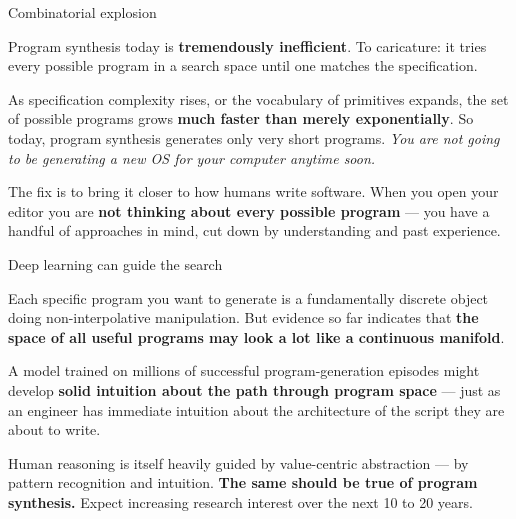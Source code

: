 \documentclass[aspectratio=169,11pt,t]{beamer}
\begin{document}
\begin{frame}[shrink=25]{Combinatorial explosion}
{\fontsize{9.4}{12.6}\selectfont\color{fg2}Program synthesis today is \textbf{tremendously inefficient}. To caricature: it tries every possible program in a search space until one matches the specification.\par}\vskip 4pt
{\fontsize{9.4}{12.6}\selectfont\color{fg2}As specification complexity rises, or the vocabulary of primitives expands, the set of possible programs grows \textbf{much faster than merely exponentially}. So today, program synthesis generates only very short programs. \textit{You are not going to be generating a new OS for your computer anytime soon.}\par}\vskip 4pt
\begin{iband}[signal]
The fix is to bring it closer to how humans write software. When you open your editor you are \textbf{not thinking about every possible program} --- you have a handful of approaches in mind, cut down by understanding and past experience.
\end{iband}
\end{frame}

\begin{frame}[shrink=25]{Deep learning can guide the search}
{\fontsize{9.4}{12.6}\selectfont\color{fg2}Each specific program you want to generate is a fundamentally discrete object doing non-interpolative manipulation. But evidence so far indicates that \textbf{the space of all useful programs may look a lot like a continuous manifold}.\par}\vskip 4pt
{\fontsize{9.4}{12.6}\selectfont\color{fg2}A model trained on millions of successful program-generation episodes might develop \textbf{solid intuition about the path through program space} --- just as an engineer has immediate intuition about the architecture of the script they are about to write.\par}\vskip 4pt
\begin{iband}[signal]
Human reasoning is itself heavily guided by value-centric abstraction --- by pattern recognition and intuition. \textbf{The same should be true of program synthesis.} Expect increasing research interest over the next 10 to 20 years.
\end{iband}
\end{frame}
\end{document}
